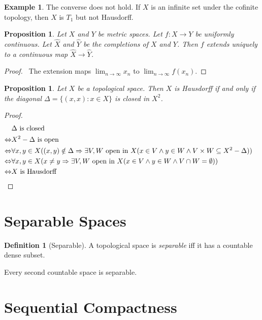 \documentclass{book}
\let\qed\relax
\newtheorem{prop}[ax]{Proposition}
\theoremstyle{definition}
\newtheorem{df}[ax]{Definition}
\newtheorem{ex}[ax]{Example}
\begin{document}
\begin{ex}
The converse does not hold. If $X$ is an infinite set under the cofinite topology, then $X$ is $T_1$ but not Hausdorff.
\end{ex}

\begin{prop}
Let $X$ and $Y$ be metric spaces. Let $f : X \rightarrow Y$ be uniformly continuous. Let $\hat{X}$ and $\hat{Y}$ be the completions of $X$ and $Y$. Then $f$ extends uniquely to a continuous map $\hat{X} \rightarrow \hat{Y}$.
\end{prop}

\begin{proof}
\pf\ The extension maps $\lim_{n \rightarrow \infty} x_n$ to $\lim_{n \rightarrow \infty} f(x_n)$. \qed
\end{proof}

\begin{prop}
Let $X$ be a topological space. Then $X$ is Hausdorff if and only if the diagonal $\Delta = \{ (x,x) : x \in X \}$ is closed in $X^2$.
\end{prop}

\begin{proof}
\pf
\begin{align*}
& \Delta \text{ is closed} \\
\Leftrightarrow & X^2 - \Delta \text{ is open} \\
\Leftrightarrow & \forall x,y \in X ((x,y) \notin \Delta \Rightarrow \exists V,W \text{ open in } X (x \in V \wedge y \in W \wedge V \times W \subseteq X^2 - \Delta)) \\
\Leftrightarrow & \forall x,y \in X (x \neq y \Rightarrow \exists V,W \text{ open in } X (x \in V \wedge y \in W \wedge V \cap W = \emptyset)) \\
\Leftrightarrow & X \text{ is Hausdorff} & \qed
\end{align*}
\end{proof}

\section{Separable Spaces}

\begin{df}[Separable]
A topological space is \emph{separable} iff it has a countable dense subset.
\end{df}

Every second countable space is separable.

\section{Sequential Compactness}
\end{document}
